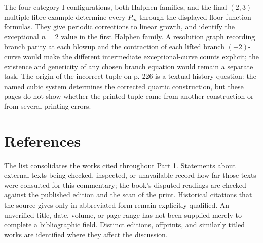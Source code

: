 \begin{remark}
The four category-I configurations, both Halphen families, and the final
$(2,3)$-multiple-fibre example determine every $P_m$ through the displayed
floor-function formulas. They give periodic corrections to linear growth,
and identify the exceptional $n=2$ value in the first Halphen family. A
resolution graph recording branch parity at each blowup and the contraction
of each lifted branch $(-2)$-curve would make the different intermediate
exceptional-curve counts explicit; the existence and genericity of any
chosen branch equation would remain a separate task. The origin of the
incorrect tuple on p. 226 is a textual-history question: the named cubic
system determines the corrected quartic construction, but these pages do
not show whether the printed tuple came from another construction or from
several printing errors.
\end{remark}

\section*{References}

The list consolidates the works cited throughout Part 1. Statements about external texts being checked, inspected, or unavailable record how far those texts were consulted for this commentary; the book's disputed readings are checked against the published edition and the scan of the print. Historical citations that the source gives only in abbreviated form remain explicitly qualified. An unverified title, date, volume, or page range has not been supplied merely to complete a bibliographic field. Distinct editions, offprints, and similarly titled works are identified where they affect the discussion.

